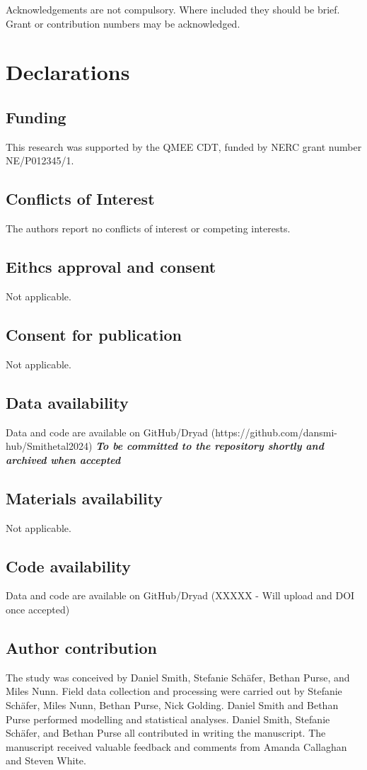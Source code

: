 \documentclass[lineno,sn-basic]{sn-jnl}%
\begin{document}
Acknowledgements are not compulsory. Where included they should be brief. Grant or contribution numbers may be acknowledged.

\section*{Declarations}

\subsection{Funding}
This research was supported by the QMEE CDT, funded by NERC grant number NE/P012345/1.
\subsection{Conflicts of Interest}
The authors report no conflicts of interest or competing interests.
\subsection{Eithcs approval and consent}
Not applicable.
\subsection{Consent for publication}
Not applicable.
\subsection{Data availability}
Data and code are available on GitHub/Dryad (https://github.com/dansmi-hub/Smithetal2024) \textbf{\textit{To be committed to the repository shortly and archived when accepted}}
\subsection{Materials availability}
Not applicable.
\subsection{Code availability}
Data and code are available on GitHub/Dryad (XXXXX - Will upload and DOI once accepted)
\subsection{Author contribution}
The study was conceived by Daniel Smith, Stefanie Schäfer, Bethan Purse, and Miles Nunn. Field data collection and processing were carried out by Stefanie Schäfer, Miles Nunn, Bethan Purse, Nick Golding. Daniel Smith and Bethan Purse performed modelling and statistical analyses. Daniel Smith, Stefanie Schäfer, and Bethan Purse all contributed in writing the manuscript. The manuscript received valuable feedback and comments from Amanda Callaghan and Steven White.
\end{document}
